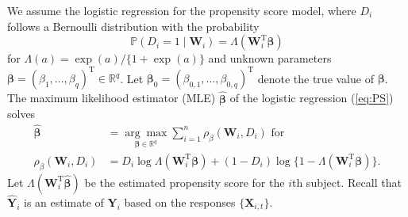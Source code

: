 \documentclass[12pt]{article}
\def\be{\begin{equation}}
\def\ee{\end{equation}}
\def\bea{\begin{eqnarray}}
\def\T{{ \mathrm{\scriptscriptstyle T} }}
\theoremstyle{definition}
\newcommand{\bW}{{\mathbf W}}
\newcommand{\bX}{{\mathbf X}}
\newcommand{\bY}{{\mathbf Y}}
\newcommand{\bbeta}  {\boldsymbol{\beta}}
\begin{document}
%
We assume the logistic regression for the propensity score model, where $D_{i}$ follows a Bernoulli distribution with the probability 
\be
\mathbb{P}(D_{i} = 1 \mid \bW_{i}) = \Lambda(\bW_{i}^{\T}\bbeta)
\label{eq:PS}\ee 
for $\Lambda(a)=\exp(a)/\{1+\exp(a)\}$ and unknown parameters
$\bbeta = (\beta_{1}, \ldots, \beta_{q})^{\T} \in \mathbb{R}^{q}$.
Let $\bbeta_0 = (\beta_{0, 1}, \ldots, \beta_{0, q})^{\T}$ denote the true value of $\bbeta$.
The maximum likelihood estimator (MLE) $\hat{\bbeta}$ of the logistic regression (\ref{eq:PS}) solves 
\be\begin{split}
\hat{\bbeta} &= \underset{\bbeta \in \mathbb{R}^{q}}{\arg\max} \sum_{i=1}^{n} \rho_{\beta}(\bW_{i}, D_{i})
\mbox{ \ for \ } \label{eq:mle1} \\
\rho_{\beta}(\bW_{i}, D_{i}) &= D_{i}\log\Lambda(\bW_{i}^{\T}\bbeta) + (1 - D_{i}) \log\{1-\Lambda(\bW_{i}^{\T}\bbeta)\}. 
\end{split}\ee
Let $\Lambda(\bW_{i}^{\T}\hat{\bbeta})$ be the estimated propensity score for the $i$th subject.
Recall that $\hat{\bY}_{i}$ is an estimate of $\bY_{i}$ based on the responses $\{\bX_{i, t}\}$. 
\end{document}

